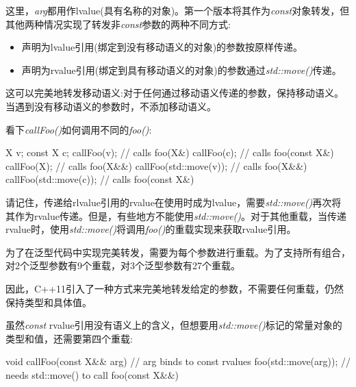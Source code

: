 这里，\textit{arg}都用作lvalue(具有名称的对象)。第一个版本将其作为\textit{const}对象转发，但其他两种情况实现了转发非\textit{const}参数的两种不同方式:\par

\begin{itemize}
  \item 声明为lvalue引用(绑定到没有移动语义的对象)的参数按原样传递。
  \item 声明为rvalue引用(绑定到具有移动语义的对象)的参数通过\textit{std::move()}传递。
\end{itemize}

这可以完美地转发移动语义:对于任何通过移动语义传递的参数，保持移动语义。当遇到没有移动语义的参数时，不添加移动语义。\par

看下\textit{callFoo()}如何调用不同的\textit{foo()}:\par

\begin{codebox}[cpp]
X v;
const X c;
callFoo(v); // calls foo(X&)
callFoo(c); // calls foo(const X&)
callFoo(X{}); // calls foo(X&&)
callFoo(std::move(v)); // calls foo(X&&)
callFoo(std::move(c)); // calls foo(const X&)
\end{codebox}

请记住，传递给rlvalue引用的rvalue在使用时成为lvalue，需要\textit{std::move()}再次将其作为rvalue传递。但是，有些地方不能使用\textit{std::move()}。对于其他重载，当传递rvalue时，使用\textit{std::move()}将调用\textit{foo()}的重载实现来获取rvalue引用。\par

为了在泛型代码中实现完美转发，需要为每个参数进行重载。为了支持所有组合，对2个泛型参数有9个重载，对3个泛型参数有27个重载。\par

因此，C++11引入了一种方式来完美地转发给定的参数，不需要任何重载，仍然保持类型和具体值。\par


虽然\textit{const} rvalue引用没有语义上的含义，但想要用\textit{std::move()}标记的常量对象的类型和值，还需要第四个重载:\par

\begin{codebox}[cpp]
void callFoo(const X&& arg) { // arg binds to const rvalues
  foo(std::move(arg)); // needs std::move() to call foo(const X&&)
}
\end{codebox}

